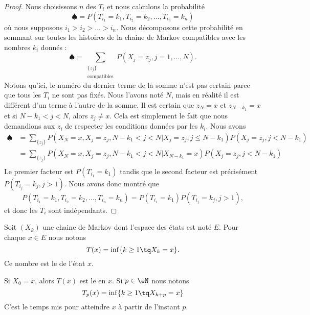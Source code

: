 \begin{proof}
	Nous choisissons \( n\) des \( T_i\) et nous calculons la probabilité
	\begin{equation}
		\spadesuit=P(T_{i_1}=k_1,T_{i_2}=k_2,\ldots,T_{i_n}=k_n)
	\end{equation}
	où nous supposons \( i_1>i_2>\ldots>i_n\). Nous décomposons cette probabilité en sommant sur toutes les histoires de la chaine de Markov compatibles avec les nombres \( k_i\) donnés :
	\begin{equation}
		\spadesuit=\sum_{\substack{\{ z_j \}\\\text{compatibles}}}P(X_j=z_j,j=1,\ldots,N).
	\end{equation}
	Notons qu'ici, le numéro du dernier terme de la somme n'est pas certain parce que tous les \( T_i\) ne sont pas fixés. Nous l'avons noté \( N\), mais en réalité il est différent d'un terme à l'autre de la somme. Il est certain que \( z_N=x\) et \( z_{N-k_1}=x\) et si \( N-k_1<j<N\), alors \( z_j\neq x\). Cela est simplement le fait que nous demandions aux \( z_i\) de respecter les conditions données par les \( k_i\). Nous avons
	\begin{subequations}
		\begin{align}
			\spadesuit & =\sum_{\{ z_j \}} P(X_N=x,X_j=z_j,N-k_1<j<N|X_j=z_j,j\leq N-k_1)P(X_j=z_j,j<N-k_1) \\
			           & =\sum_{\{ z_j \}} P(X_N=x,X_j=z_j,N-k_1<j<N|X_{N-k_1}=x)P(X_j=z_j,j<N-k_1)         \\
		\end{align}
	\end{subequations}
	Le premier facteur est \( P(T_{i_1}=k_1)\) tandis que le second facteur est précisément \( P(T_{i_j}=k_j,j>1)\). Nous avons donc montré que
	\begin{equation}
		P(T_{i_1}=k_1,T_{i_2}=k_2,\ldots,T_{i_n}=k_n)=P(T_{i_1}=k_1)P(T_{i_j}=k_j,j>1),
	\end{equation}
	et donc les \( T_i\) sont indépendants.
\end{proof}

\begin{definition}		\label{DEFooDWLAooINqgep}
	Soit \( (X_k)\) une chaine de Markov dont l'espace des états est noté \( E\). Pour chaque \(  x\in E\) nous notons
	\begin{equation}
		T(x)=\inf\{ k\geq 1\tq X_k=x \}.
	\end{equation}
	Ce nombre est le	 de l'état \( x\).

	Si \( X_0=x\), alors \( T(x)\) est le  en \( x\). Si \( p\in \eN\) nous notons
	\begin{equation}
		T_p(x)=\inf\{ k\geq 1\tq X_{k+p}=x \}
	\end{equation}
	C'est le temps mis pour atteindre \( x\) à partir de l'instant \( p\).
\end{definition}

